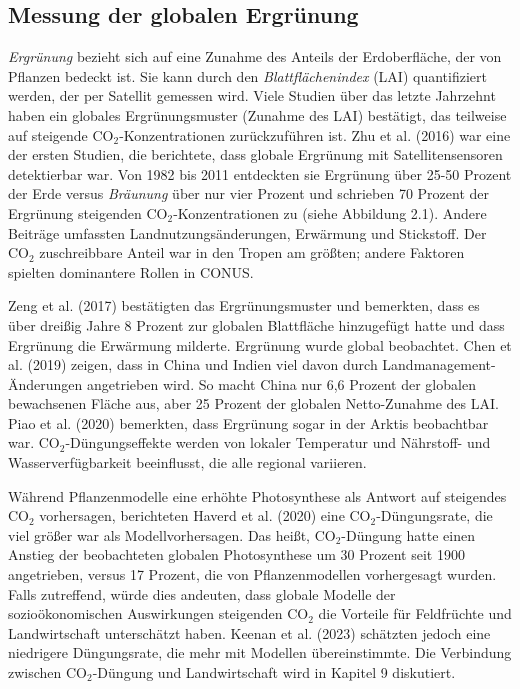 \documentclass[12pt,paper=a4,DIV=12,parskip=never,chapterprefix=false,headings=standardclasses]{scrreprt}
\begin{document}
\subsection{Messung der globalen Ergrünung}

\emph{Ergrünung} bezieht sich auf eine Zunahme des Anteils der Erdoberfläche, der von Pflanzen bedeckt ist. Sie kann durch den \emph{Blattflächenindex} (LAI) quantifiziert werden, der per Satellit gemessen wird. Viele Studien über das letzte Jahrzehnt haben ein globales Ergrünungsmuster (Zunahme des LAI) bestätigt, das teilweise auf steigende CO$_2$-Konzentrationen zurückzuführen ist. Zhu et al. (2016) war eine der ersten Studien, die berichtete, dass globale Ergrünung mit Satellitensensoren detektierbar war. Von 1982 bis 2011 entdeckten sie Ergrünung über 25-50 Prozent der Erde versus \emph{Bräunung} über nur vier Prozent und schrieben 70 Prozent der Ergrünung steigenden CO$_2$-Konzentrationen zu (siehe Abbildung 2.1). Andere Beiträge umfassten Landnutzungsänderungen, Erwärmung und Stickstoff. Der CO$_2$ zuschreibbare Anteil war in den Tropen am größten; andere Faktoren spielten dominantere Rollen in CONUS.

Zeng et al. (2017) bestätigten das Ergrünungsmuster und bemerkten, dass es über dreißig Jahre 8 Prozent zur globalen Blattfläche hinzugefügt hatte und dass Ergrünung die Erwärmung milderte. Ergrünung wurde global beobachtet. Chen et al. (2019) zeigen, dass in China und Indien viel davon durch Landmanagement-Änderungen angetrieben wird. So macht China nur 6,6 Prozent der globalen bewachsenen Fläche aus, aber 25 Prozent der globalen Netto-Zunahme des LAI. Piao et al. (2020) bemerkten, dass Ergrünung sogar in der Arktis beobachtbar war. CO$_2$-Düngungseffekte werden von lokaler Temperatur und Nährstoff- und Wasserverfügbarkeit beeinflusst, die alle regional variieren.

Während Pflanzenmodelle eine erhöhte Photosynthese als Antwort auf steigendes CO$_2$ vorhersagen, berichteten Haverd et al. (2020) eine CO$_2$-Düngungsrate, die viel größer war als Modellvorhersagen. Das heißt, CO$_2$-Düngung hatte einen Anstieg der beobachteten globalen Photosynthese um 30 Prozent seit 1900 angetrieben, versus 17 Prozent, die von Pflanzenmodellen vorhergesagt wurden. Falls zutreffend, würde dies andeuten, dass globale Modelle der sozioökonomischen Auswirkungen steigenden CO$_2$ die Vorteile für Feldfrüchte und Landwirtschaft unterschätzt haben. Keenan et al. (2023) schätzten jedoch eine niedrigere Düngungsrate, die mehr mit Modellen übereinstimmte. Die Verbindung zwischen CO$_2$-Düngung und Landwirtschaft wird in Kapitel 9 diskutiert.
\end{document}
